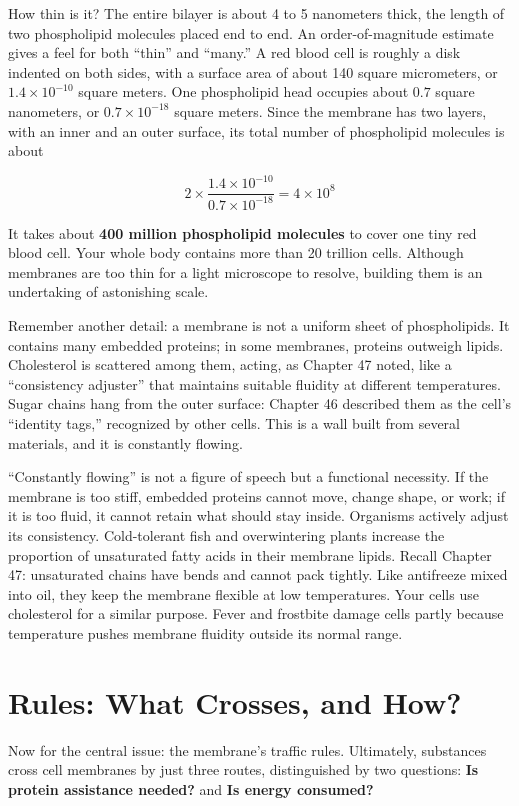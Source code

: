 How thin is it? The entire bilayer is about 4 to 5 nanometers thick, the length of two phospholipid molecules placed end to end. An order-of-magnitude estimate gives a feel for both ``thin'' and ``many.'' A red blood cell is roughly a disk indented on both sides, with a surface area of about 140 square micrometers, or $1.4\times 10^{-10}$ square meters. One phospholipid head occupies about $0.7$ square nanometers, or $0.7\times 10^{-18}$ square meters. Since the membrane has two layers, with an inner and an outer surface, its total number of phospholipid molecules is about

\[2\times \frac{1.4\times 10^{-10}}{0.7\times 10^{-18}} = 4\times 10^{8}\]

It takes about \textbf{400 million phospholipid molecules} to cover one tiny red blood cell. Your whole body contains more than 20 trillion cells. Although membranes are too thin for a light microscope to resolve, building them is an undertaking of astonishing scale.

Remember another detail: a membrane is not a uniform sheet of phospholipids. It contains many embedded proteins; in some membranes, proteins outweigh lipids. Cholesterol is scattered among them, acting, as Chapter 47 noted, like a ``consistency adjuster'' that maintains suitable fluidity at different temperatures. Sugar chains hang from the outer surface: Chapter 46 described them as the cell's ``identity tags,'' recognized by other cells. This is a wall built from several materials, and it is constantly flowing.

``Constantly flowing'' is not a figure of speech but a functional necessity. If the membrane is too stiff, embedded proteins cannot move, change shape, or work; if it is too fluid, it cannot retain what should stay inside. Organisms actively adjust its consistency. Cold-tolerant fish and overwintering plants increase the proportion of unsaturated fatty acids in their membrane lipids. Recall Chapter 47: unsaturated chains have bends and cannot pack tightly. Like antifreeze mixed into oil, they keep the membrane flexible at low temperatures. Your cells use cholesterol for a similar purpose. Fever and frostbite damage cells partly because temperature pushes membrane fluidity outside its normal range.

\section{Rules: What Crosses, and How?}

Now for the central issue: the membrane's traffic rules. Ultimately, substances cross cell membranes by just three routes, distinguished by two questions: \textbf{Is protein assistance needed?} and \textbf{Is energy consumed?}

